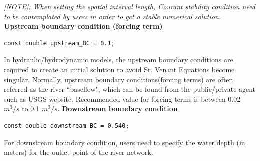 \documentclass[12pt, letterpaper]{article}
\begin{document}
\begin{appendices}
\begin{flushleft}
\emph{[NOTE]: When setting the spatial interval length, Courant stability condition need to be contemplated by users in order to get a stable numerical solution.}
\newline
\newline
\textbf{Upstream boundary condition (forcing term)}
\lstset{showstringspaces=false}
\begin{lstlisting}[frame=single]
const double upstream_BC = 0.1;  
\end{lstlisting}
In hydraulic/hydrodynamic models, the upstream boundary conditions are required to create an initial solution to avoid St. Venant Equations become singular. Normally, upstream boundary conditions(forcing terms) are often referred as the river ``baseflow", which can be found from the public/private agent such as USGS website. Recommended value for forcing terms is between 0.02 $m^3/s$ to 0.1 $m^3/s$.
\newline
\newline
\textbf{Downstream boundary condition}
\lstset{showstringspaces=false}
\begin{lstlisting}[frame=single]
const double downstream_BC = 0.540;  
\end{lstlisting}
For downstream boundary condition, users need to specify the water depth (in meters) for the outlet point of the river network. 




\end{flushleft}
\end{appendices}
\end{document}
